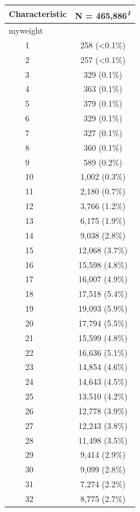 \documentclass[
  letterpaper,
  DIV=11,
  numbers=noendperiod]{scrartcl}
\begin{document}
\begin{enumerate}
  \begin{table}
  \fontsize{12.0pt}{14.4pt}\selectfont
  \begin{tabular*}{\linewidth}{@{\extracolsep{\fill}}lc}
  \toprule
  \textbf{Characteristic} & \textbf{N = 465,886}\textsuperscript{\textit{1}} \\ 
  \midrule\addlinespace[2.5pt]
  myweight &  \\ 
      1 & 258 (<0.1\%) \\ 
      2 & 257 (<0.1\%) \\ 
      3 & 329 (0.1\%) \\ 
      4 & 363 (0.1\%) \\ 
      5 & 379 (0.1\%) \\ 
      6 & 329 (0.1\%) \\ 
      7 & 327 (0.1\%) \\ 
      8 & 360 (0.1\%) \\ 
      9 & 589 (0.2\%) \\ 
      10 & 1,002 (0.3\%) \\ 
      11 & 2,180 (0.7\%) \\ 
      12 & 3,766 (1.2\%) \\ 
      13 & 6,175 (1.9\%) \\ 
      14 & 9,038 (2.8\%) \\ 
      15 & 12,068 (3.7\%) \\ 
      16 & 15,598 (4.8\%) \\ 
      17 & 16,007 (4.9\%) \\ 
      18 & 17,518 (5.4\%) \\ 
      19 & 19,093 (5.9\%) \\ 
      20 & 17,794 (5.5\%) \\ 
      21 & 15,599 (4.8\%) \\ 
      22 & 16,636 (5.1\%) \\ 
      23 & 14,854 (4.6\%) \\ 
      24 & 14,643 (4.5\%) \\ 
      25 & 13,510 (4.2\%) \\ 
      26 & 12,778 (3.9\%) \\ 
      27 & 12,243 (3.8\%) \\ 
      28 & 11,498 (3.5\%) \\ 
      29 & 9,414 (2.9\%) \\ 
      30 & 9,099 (2.8\%) \\ 
      31 & 7,274 (2.2\%) \\ 
      32 & 8,775 (2.7\%) \\ 

\end{tabular*}
\end{table}
\end{enumerate}
\end{document}
